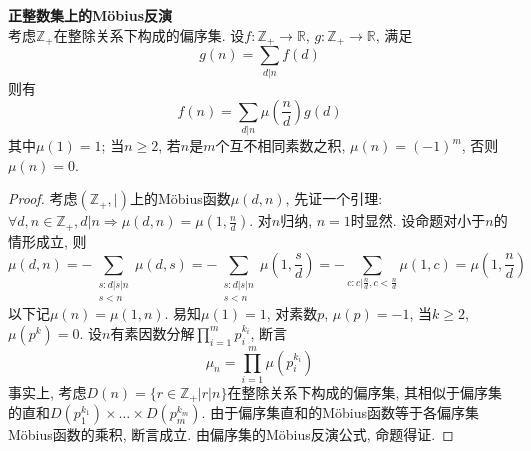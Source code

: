 \begin{pro} \textbf{正整数集上的Möbius反演}\\
考虑$\mathbb{Z}_+$在整除关系下构成的偏序集. 设$f: \mathbb{Z}_+ \to \mathbb{R}$, $g: \mathbb{Z}_+ \to \mathbb{R}$, 满足
\begin{equation}
    g(n)=\sum_{d|n} f(d)
\end{equation}
则有
\begin{equation}
    f(n)=\sum_{d|n} \mu\left(\frac{n}{d}\right)g(d)
\end{equation}
其中$\mu(1)=1$; 当$n\ge 2$, 若$n$是$m$个互不相同素数之积, $\mu(n)=(-1)^m$, 否则$\mu(n)=0$. 
\end{pro}
\begin{proof}
考虑$(\mathbb{Z}_+, |)$上的Möbius函数$\mu(d,n)$, 先证一个引理: $\forall d,n\in \mathbb{Z}_+, d | n \Rightarrow \mu(d,n)=\mu(1,\frac{n}{d})$. 对$n$归纳, $n=1$时显然. 设命题对小于$n$的情形成立, 则
\begin{equation}
    \mu(d,n)=-\sum_{\substack{s:d|s|n\\s<n}} \mu(d,s) = -\sum_{\substack{s:d|s|n\\s<n}} \mu(1,\frac{s}{d}) = -\sum_{c:c|\frac{n}{d}, c<\frac{n}{d}} \mu(1,c) = \mu(1,\frac{n}{d})
\end{equation}
以下记$\mu(n)=\mu(1,n)$. 易知$\mu(1)=1$, 对素数$p$, $\mu(p)=-1$, 当$k\ge 2$, $\mu(p^k)=0$. 设$n$有素因数分解$\prod_{i=1}^m p_i^{k_i}$, 断言\begin{equation}
    \mu_{n}=\prod_{i=1}^m \mu(p_i^{k_i})
\end{equation}
事实上, 考虑$D(n)=\{r\in \mathbb{Z}_+\vert r|n\}$在整除关系下构成的偏序集, 其相似于偏序集的直和$D(p_1^{k_1})\times \dots \times D(p_m^{k_m})$. 由于偏序集直和的Möbius函数等于各偏序集Möbius函数的乘积, 断言成立. 由偏序集的Möbius反演公式, 命题得证.
\end{proof}

